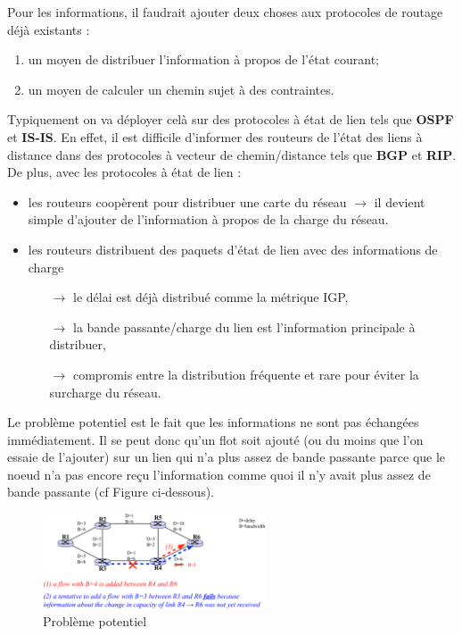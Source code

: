 \documentclass{article}
\begin{document}
\begin{sffamily}
\noindent Pour les informations, il faudrait ajouter deux choses aux protocoles de routage déjà existants : 
\begin{enumerate}
\item un moyen de distribuer l'information à propos de l'état courant;
\item un moyen de calculer un chemin sujet à des contraintes.
\end{enumerate}

\noindent Typiquement on va déployer celà sur des protocoles à état de lien tels que \textbf{OSPF} et \textbf{IS-IS}. En effet, 
il est difficile d'informer des routeurs de l'état des liens à distance dans des protocoles à vecteur de chemin/distance tels 
que \textbf{BGP} et \textbf{RIP}. De plus, avec les protocoles à état de lien :
\begin{itemize}
\item les routeurs coopèrent pour distribuer une carte du réseau $\rightarrow$ il devient simple d'ajouter de l'information à 
propos de la charge du réseau.
\item les routeurs distribuent des paquets d'état de lien avec des informations de charge
\begin{itemize}
\item[$\rightarrow$] le délai est déjà distribué comme la métrique IGP,
\item[$\rightarrow$] la bande passante/charge du lien est l'information principale à distribuer,
\item[$\rightarrow$] compromis entre la distribution fréquente et rare pour éviter la surcharge du réseau.
\end{itemize}
\end{itemize}

Le problème potentiel est le fait que les informations ne sont pas échangées immédiatement. Il se peut donc qu'un flot soit 
ajouté (ou du moins que l'on essaie de l'ajouter) sur un lien qui n'a plus assez de bande passante parce que le noeud n'a pas 
encore reçu l'information comme quoi il n'y avait plus assez de bande passante (cf Figure ci-dessous).

\begin{figure}[h!]
    \begin{center}
    \includegraphics[width=250px]{img_021.pdf}
    \caption{Problème potentiel}
    \end{center}	
\end{figure}


\end{sffamily}
\end{document}
